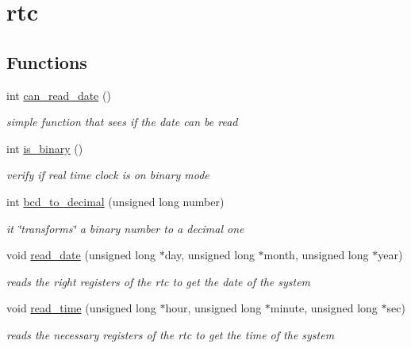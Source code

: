 \hypertarget{group__rtc}{}\section{rtc}
\label{group__rtc}
\subsection*{Functions}
\begin{DoxyCompactItemize}
\item 
int \hyperlink{group__rtc_ga5960e020c86a383a63cdead42f3928b9}{can\+\_\+read\+\_\+date} ()
\begin{DoxyCompactList}\small\item\em simple function that sees if the date can be read \end{DoxyCompactList}\item 
int \hyperlink{group__rtc_gae1b1b1cc88f89eae300cdeef578da474}{is\+\_\+binary} ()
\begin{DoxyCompactList}\small\item\em verify if real time clock is on binary mode \end{DoxyCompactList}\item 
int \hyperlink{group__rtc_ga841ea89e213413164d1e5e4a9394a955}{bcd\+\_\+to\+\_\+decimal} (unsigned long number)
\begin{DoxyCompactList}\small\item\em it \char`\"{}transforms\char`\"{} a binary number to a decimal one \end{DoxyCompactList}\item 
void \hyperlink{group__rtc_ga2ed53b5a2ef633341d444c26659c2e58}{read\+\_\+date} (unsigned long $\ast$day, unsigned long $\ast$month, unsigned long $\ast$year)
\begin{DoxyCompactList}\small\item\em reads the right registers of the rtc to get the date of the system \end{DoxyCompactList}\item 
void \hyperlink{group__rtc_ga361f06856ed8c5dfb47c2e01af6a7470}{read\+\_\+time} (unsigned long $\ast$hour, unsigned long $\ast$minute, unsigned long $\ast$sec)
\begin{DoxyCompactList}\small\item\em reads the necessary registers of the rtc to get the time of the system \end{DoxyCompactList}\end{DoxyCompactItemize}


